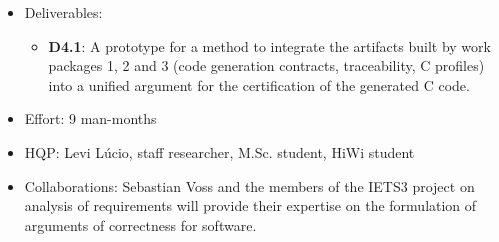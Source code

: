 \begin{itemize}
  \item Deliverables:
  \begin{itemize}
    \item{\textbf{D4.1}:} A prototype for a method to integrate the artifacts
    built by work packages 1, 2 and 3 (code generation contracts, traceability, C profiles)
    into a unified argument for the certification of the generated C code.
  \end{itemize}
  \item Effort: 9 man-months
  \item HQP: Levi L\'ucio, staff researcher, M.Sc. student, HiWi student 
  \item Collaborations: Sebastian Voss and the members of the IETS3 project on
  analysis of requirements will provide their expertise on the formulation of
  arguments of correctness for software.
\end{itemize}